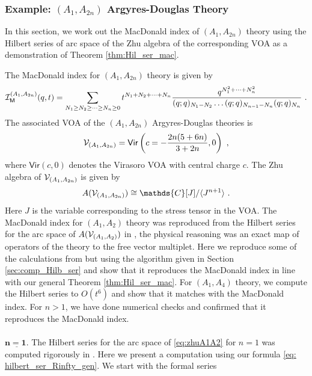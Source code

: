\documentclass[a4paper,10pt]{article}
\newcommand{\C}{\mathds{C}}
\newcommand{\mr}[1]{\mathsf{#1}}
\newcommand{\tsf}[1]{\textsf{#1}}
\def\CI {{\cal I}}
\def\CV {{\cal V}}
\def\CI {{{\cal I}}}
\begin{document}
\subsubsection{Example: $(A_1,A_{2n})$ Argyres-Douglas Theory}
In this section, we work out the MacDonald index of $(A_1,A_{2n})$ theory using the Hilbert series of arc space of the Zhu algebra of the corresponding \tsf{VOA} as a demonstration of Theorem \ref{thm:Hil_ser_mac}. \par 
The MacDonald index for $(A_1,A_{2n})$ theory is given by \cite{Buican:2015tda}
\begin{equation}\label{eq:Mac_A_1A2n}
    \CI_{\mr{M}}^{(A_1,A_{2n})}(q,t)=\sum_{N_1\geq N_2\geq\dots\geq N_{n}\geq 0}t^{N_1+N_2+\dots+N_{n}}\frac{q^{N_1^2+\dots+N_{n}^2}}{(q;q)_{N_1-N_2}\dots (q;q)_{N_{n-1}-N_{n}}(q;q)_{N_{n}}}~.
\end{equation}
The associated \tsf{VOA} of the $(A_1,A_{2n})$ Argyres-Douglas theories is \cite{beem2014infinite,Beem:2017ooy}
\begin{equation}
    \CV_{(A_1,A_{2n})}=\mr{Vir}\left(c=-\frac{2 n(5+6 n)}{3+2 n},0\right)~,
\end{equation}
where $\mr{Vir}(c,0)$ denotes the Virasoro \tsf{VOA} with central charge $c$. The Zhu algebra of $\CV_{(A_1,A_{2n})}$ is given by \cite{Beem:2017ooy} 
\begin{equation}\label{eq:zhuA1A2}
A(\CV_{(A_1,A_{2n})})\cong \C[J]/\langle J^{n+1}\rangle~.    
\end{equation}
Here $J$ is the variable corresponding to the stress tensor in the \tsf{VOA}.
The MacDonald index for $(A_1,A_2)$ theory was reproduced from the Hilbert series for the arc space of $A(\CV_{(A_1,A_{2})})$ in \cite{Bhargava:2023hsc}, the physical reasoning was an exact map of operators of the theory to the free vector multiplet. Here we reproduce some of the calculations from \cite{Bhargava:2023hsc} but using the algorithm given in Section \ref{sec:comp_Hilb_ser} and show that it reproduces the MacDonald index in line with our general Theorem \ref{thm:Hil_ser_mac}. For $(A_1,A_4)$ theory, we compute the Hilbert series to $O(t^6)$ and show that it matches with the MacDonald index. For $n>1$, we have done numerical checks and confirmed that it reproduces the MacDonald index.  
\\\\
$\underline{\boldsymbol{n=1}.}$ The Hilbert series for the arc space of \eqref{eq:zhuA1A2} for $n=1$ was computed rigorously in  \cite{bruschek2011arc,bai2020quadratic}. Here we present a computation using our formula \eqref{eq: hilbert_ser_Rinfty_gen}.  We start with the formal series 
\end{document}
